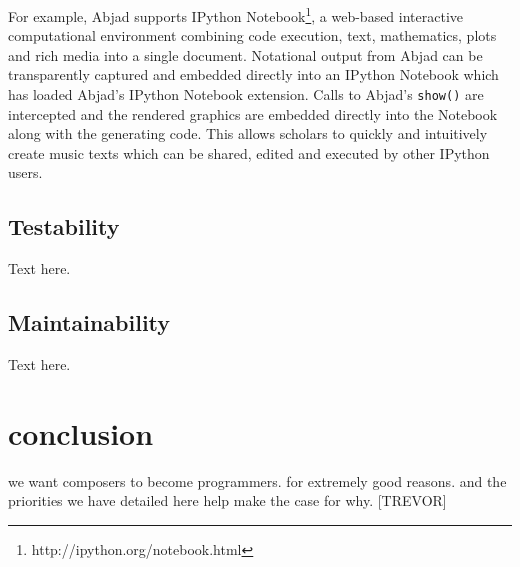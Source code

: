 \documentclass{article}
\begin{document}
For example, Abjad supports IPython
Notebook\footnote{http://ipython.org/notebook.html}, a web-based interactive
computational environment combining code execution, text, mathematics, plots
and rich media into a single document. Notational output from Abjad can be
transparently captured and embedded directly into an IPython Notebook which has
loaded Abjad's IPython Notebook extension. Calls to Abjad's \texttt{show()} are
intercepted and the rendered graphics are embedded directly into the Notebook
along with the generating code. This allows scholars to quickly and intuitively
create music texts which can be shared, edited and executed by other IPython
users.

\subsection{Testability}

Text here.

\subsection{Maintainability}

Text here.

\section{conclusion}

we want composers to become programmers. for extremely good reasons. and the
priorities we have detailed here help make the case for why. [TREVOR]


\end{document}
